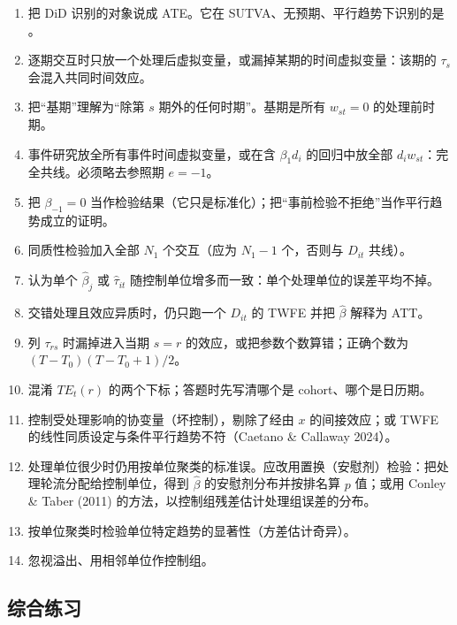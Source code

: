 \begin{enumerate}
  \item 把 DiD 识别的对象说成 ATE。它在 SUTVA、无预期、平行趋势下识别的是 。
  \item 逐期交互时只放一个处理后虚拟变量，或漏掉某期的时间虚拟变量：该期的 $\tau_s$ 会混入共同时间效应。
  \item 把“基期”理解为“除第 $s$ 期外的任何时期”。基期是所有 $w_{st}=0$ 的处理前时期。
  \item 事件研究放全所有事件时间虚拟变量，或在含 $\beta_1d_i$ 的回归中放全部 $d_iw_{st}$：完全共线。必须略去参照期 $e=-1$。
  \item 把 $\beta_{-1}=0$ 当作检验结果（它只是标准化）；把“事前检验不拒绝”当作平行趋势成立的证明。
  \item 同质性检验加入全部 $N_1$ 个交互（应为 $N_1-1$ 个，否则与 $D_{it}$ 共线）。
  \item 认为单个 $\hat\beta_j$ 或 $\hat\tau_{it}$ 随控制单位增多而一致：单个处理单位的误差平均不掉。
  \item 交错处理且效应异质时，仍只跑一个 $D_{it}$ 的 TWFE 并把 $\hat\beta$ 解释为 ATT。
  \item 列 $\tau_{rs}$ 时漏掉进入当期 $s=r$ 的效应，或把参数个数算错；正确个数为 $(T-T_0)(T-T_0+1)/2$。
  \item 混淆 $TE_t(r)$ 的两个下标；答题时先写清哪个是 cohort、哪个是日历期。
  \item 控制受处理影响的协变量（坏控制），剔除了经由 $x$ 的间接效应；或 TWFE 的线性同质设定与条件平行趋势不符（Caetano \& Callaway 2024）。
  \item 处理单位很少时仍用按单位聚类的标准误。应改用置换（安慰剂）检验：把处理轮流分配给控制单位，得到 $\hat\beta$ 的安慰剂分布并按排名算 $p$ 值；或用 Conley \& Taber (2011) 的方法，以控制组残差估计处理组误差的分布。
  \item 按单位聚类时检验单位特定趋势的显著性（方差估计奇异）。
  \item 忽视溢出、用相邻单位作控制组。
\end{enumerate}

\subsection{综合练习}


